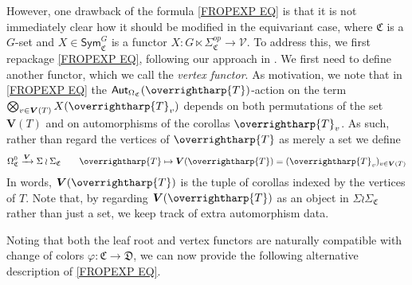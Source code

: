 \documentclass[a4paper,10pt
,draft
]{article}%
\numberwithin{equation}{section}
\numberwithin{figure}{section}
\theoremstyle{definition} %
\newcommand{\vect}[1]{\text{\overrightharp{\ensuremath{#1}}}}
\newcommand{\V}{\ensuremath{\mathcal V}}
\newcommand{\1}{\ensuremath{\mathbbm 1}}%
\begin{document}
However, one drawback of the formula  
\eqref{FROPEXP EQ}
is that it is not immediately clear how it should be modified 
in the equivariant case,
where $\mathfrak{C}$ is a $G$-set
and $X \in \mathsf{Sym}^G_{\mathfrak{C}}$
is a functor 
$X \colon G \ltimes \Sigma_{\mathfrak{C}}^{op} \to \V$.
To address this, we first repackage \eqref{FROPEXP EQ}, 
following our approach in \cite[\S 4]{BP_geo}.
We first need to define another functor, which we call the \emph{vertex functor}.
As motivation, we note that
in \eqref{FROPEXP EQ}
the $\mathsf{Aut}_{\Omega_{\mathfrak{C}}}(\vect{T})$-action
on the term
$\bigotimes_{v \in \boldsymbol{V}(T)} X(\vect{T}_v)$
depends on both permutations 
of the set $\boldsymbol{V}(T)$
and on automorphisms of the corollas $\vect{T}_v$.
As such, rather than regard the vertices of $\vect{T}$ as merely a set
we define 
\begin{equation}\label{VFUNDEF EQ}
\Omega_{\mathfrak{C}}^0 \xrightarrow{\boldsymbol{V}} \Sigma \wr \Sigma_{\mathfrak{C}}
\qquad 
\vect{T} \mapsto 
\boldsymbol{V}(\vect{T})=(\vect{T}_v )_{v \in \boldsymbol{V}(T)}
\end{equation}
In words, $\boldsymbol{V}(\vect{T})$
is the tuple of corollas indexed by the vertices of $T$. 
Note that,
by regarding $\boldsymbol{V}(\vect{T})$ as an object in 
$\Sigma \wr \Sigma_{\mathfrak{C}}$ rather than just a set,
we keep track of extra automorphism data.

Noting that both the leaf root and vertex functors are naturally compatible with change of colors 
$\varphi \colon \mathfrak{C} \to \mathfrak{D}$, 
we can now provide the following alternative 
description of \eqref{FROPEXP EQ}.
\end{document}
